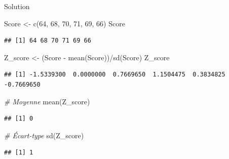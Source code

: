 \documentclass[
  ignorenonframetext,
]{beamer}
\newenvironment{Shaded}{\begin{snugshade}}{\end{snugshade}}
\newcommand{\CommentTok}[1]{\textcolor[rgb]{0.56,0.35,0.01}{\textit{#1}}}
\newcommand{\DecValTok}[1]{\textcolor[rgb]{0.00,0.00,0.81}{#1}}
\newcommand{\FunctionTok}[1]{\textcolor[rgb]{0.00,0.00,0.00}{#1}}
\newcommand{\NormalTok}[1]{#1}
\newcommand{\OtherTok}[1]{\textcolor[rgb]{0.56,0.35,0.01}{#1}}
\newcommand{\SpecialCharTok}[1]{\textcolor[rgb]{0.00,0.00,0.00}{#1}}
\begin{document}
\begin{frame}[fragile]{Solution}
\protect\hypertarget{solution}{}
\begin{Shaded}
\begin{Highlighting}[]
\NormalTok{Score }\OtherTok{\textless{}{-}} \FunctionTok{c}\NormalTok{(}\DecValTok{64}\NormalTok{, }\DecValTok{68}\NormalTok{, }\DecValTok{70}\NormalTok{, }\DecValTok{71}\NormalTok{, }\DecValTok{69}\NormalTok{, }\DecValTok{66}\NormalTok{)}
\NormalTok{Score}
\end{Highlighting}
\end{Shaded}

\begin{verbatim}
## [1] 64 68 70 71 69 66
\end{verbatim}

\begin{Shaded}
\begin{Highlighting}[]
\NormalTok{Z\_score }\OtherTok{\textless{}{-}}\NormalTok{ (Score }\SpecialCharTok{{-}} \FunctionTok{mean}\NormalTok{(Score))}\SpecialCharTok{/}\FunctionTok{sd}\NormalTok{(Score)}
\NormalTok{Z\_score}
\end{Highlighting}
\end{Shaded}

\begin{verbatim}
## [1] -1.5339300  0.0000000  0.7669650  1.1504475  0.3834825 -0.7669650
\end{verbatim}

\begin{Shaded}
\begin{Highlighting}[]
\CommentTok{\# Moyenne}
\FunctionTok{mean}\NormalTok{(Z\_score)}
\end{Highlighting}
\end{Shaded}

\begin{verbatim}
## [1] 0
\end{verbatim}

\begin{Shaded}
\begin{Highlighting}[]
\CommentTok{\# Écart{-}type}
\FunctionTok{sd}\NormalTok{(Z\_score)}
\end{Highlighting}
\end{Shaded}

\begin{verbatim}
## [1] 1
\end{verbatim}
\end{frame}
\end{document}
